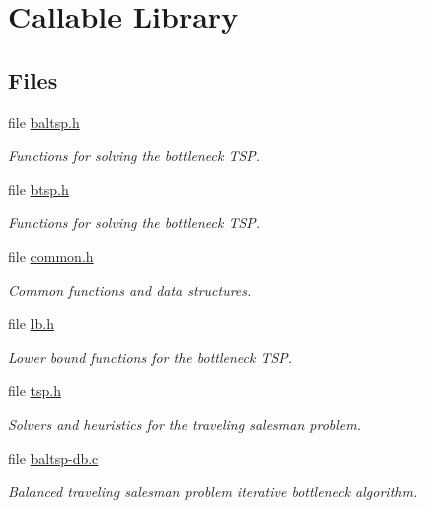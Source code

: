 \hypertarget{group__lib}{
\section{Callable Library}
\label{group__lib}
}
\subsection*{Files}
\begin{CompactItemize}
\item 
file \hyperlink{baltsp_8h}{baltsp.h}
\begin{CompactList}\small\item\em Functions for solving the bottleneck TSP. \item\end{CompactList}

\item 
file \hyperlink{btsp_8h}{btsp.h}
\begin{CompactList}\small\item\em Functions for solving the bottleneck TSP. \item\end{CompactList}

\item 
file \hyperlink{common_8h}{common.h}
\begin{CompactList}\small\item\em Common functions and data structures. \item\end{CompactList}

\item 
file \hyperlink{lb_8h}{lb.h}
\begin{CompactList}\small\item\em Lower bound functions for the bottleneck TSP. \item\end{CompactList}

\item 
file \hyperlink{tsp_8h}{tsp.h}
\begin{CompactList}\small\item\em Solvers and heuristics for the traveling salesman problem. \item\end{CompactList}

\item 
file \hyperlink{lib_2baltsp_2baltsp-db_8c}{baltsp-db.c}
\begin{CompactList}\small\item\em Balanced traveling salesman problem iterative bottleneck algorithm. \item\end{CompactList}


\end{CompactItemize}
